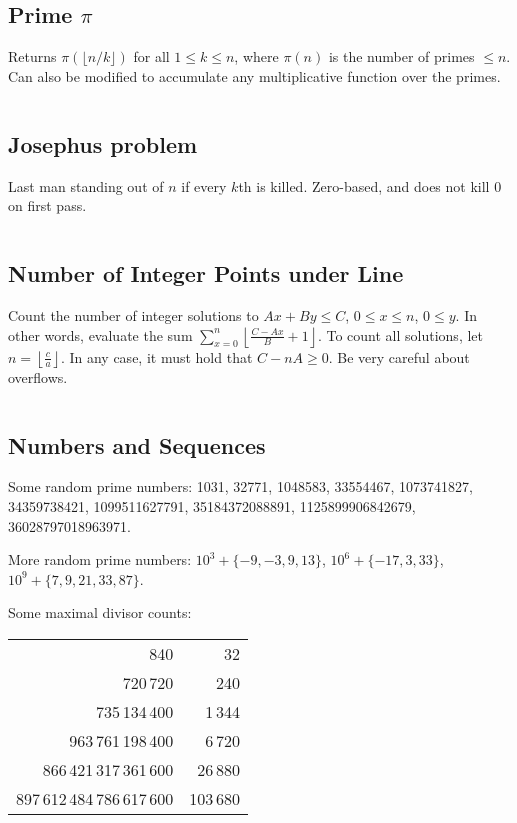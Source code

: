 \documentclass[8pt,a4paper,landscape,oneside]{amsart}
\newcommand{\code}[1]{\inputminted[fontsize=\normalsize,baselinestretch=1]{cpp}{_code/#1}}
\begin{document}
\begin{multicols*}{3}
    \subsection{Prime $\pi$}
        Returns $\pi\left(\lfloor n/k\rfloor\right)$ for all $1\leq k \leq n$,
        where $\pi(n)$ is the number of primes $\leq n$. Can also be modified
        to accumulate any multiplicative function over the primes.
        \code{mathematics/primepi.cpp}

    \subsection{Josephus problem}
        Last man standing out of $n$ if every $k$th is killed. Zero-based, and
        does not kill $0$ on first pass.
        \code{mathematics/josephus.cpp}

    \subsection{Number of Integer Points under Line}
        Count the number of integer solutions to $Ax+By\leq C$, $0 \leq x \leq
        n$, $0 \leq y$. In other words, evaluate the sum $\sum_{x=0}^n
        \left\lfloor \frac{C-Ax}{B} + 1\right\rfloor$. To count all solutions,
        let $n = \left\lfloor \frac{c}{a}\right\rfloor$. In any case, it must hold
        that $C-nA \geq 0$. Be very careful about overflows.
        \code{mathematics/floor_sum.cpp}

    \subsection{Numbers and Sequences}
        Some random prime numbers: 1031, 32771, 1048583, 33554467,
        1073741827, 34359738421, 1099511627791, 35184372088891,
        1125899906842679, 36028797018963971.

        More random prime numbers: $10^3 + \{-9,-3,9,13\}$, $10^6+
        \{-17,3,33\}$, $10^9+ \{7,9,21,33,87\}$.

        Some maximal divisor counts:
        \begin{tabular}{rr}
        840 & 32 \\
        720\,720 & 240 \\
        735\,134\,400 & 1\,344 \\
        963\,761\,198\,400 & 6\,720 \\
        866\,421\,317\,361\,600 & 26\,880 \\
        897\,612\,484\,786\,617\,600 & 103\,680 \\
        \end{tabular}


\end{multicols*}
\end{document}

